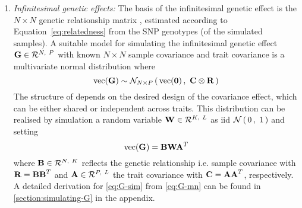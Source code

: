\begin{enumerate}
\item \textit{Infinitesimal genetic effects:} The basis of the infinitesimal genetic effect is the \(N \times N\) genetic relationship matrix , estimated according to Equation~\cref{eq:relatedness} from the SNP genotypes (of the simulated samples). A suitable model for simulating the infinitesimal genetic effect \(\boldsymbol{\mathbf{G}} \in \mathcal{R}^{N,~P}\) with known \(N \times N\) sample covariance  and trait covariance  is a multivariate normal distribution where
%
\begin{equation}
 \text{vec}(\boldsymbol{\mathbf{G}}) \sim \mathcal{N}_{N\times P}\left(\, {\text{vec}(\boldsymbol{\mathbf{0}})} \,,~{\boldsymbol{\mathbf{C}} \otimes \boldsymbol{\mathbf{R}}} \,\right)
 \label{eq:G-mn}
\end{equation}
%
The structure of  depends on the desired design of the covariance effect, which can be either shared or independent across traits. This distribution can be realised by simulation a random variable \(\boldsymbol{\mathbf{W}} \in \mathcal{R}^{K,~L}\) as iid \(\mathcal{N}\left(\,{0}\,,~{1}\,\right)\) and setting 
\begin{equation}
 \text{vec}(\boldsymbol{\mathbf{G}}) = \boldsymbol{\mathbf{BWA}}^T
 \label{eq:G-sim}
\end{equation}
where \(\boldsymbol{\mathbf{B}} \in \mathcal{R}^{N,~K}\) reflects the genetic relationship i.e. sample covariance with \(\boldsymbol{\mathbf{R}}=\boldsymbol{\mathbf{BB}}^T\) and \(\boldsymbol{\mathbf{A}} \in \mathcal{R}^{P,~L}\) the trait covariance with  \(\boldsymbol{\mathbf{C}}=\boldsymbol{\mathbf{AA}}^T\), respectively. A detailed derivation for \cref{eq:G-sim} from \cref{eq:G-mn} can be found in \cref{section:simulating-G} in the appendix.


\end{enumerate}
